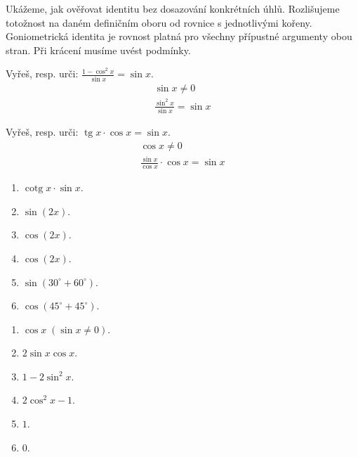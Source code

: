 \documentclass[11pt,a4paper]{article}
\begin{document}
Ukážeme, jak ověřovat identitu bez dosazování konkrétních úhlů. Rozlišujeme totožnost na daném definičním oboru od rovnice s jednotlivými kořeny.
Goniometrická identita je rovnost platná pro všechny přípustné argumenty obou stran. Při krácení musíme uvést podmínky.
\begin{prikladReseniBox}[title={Příklad 1}]
Vyřeš, resp. urči: $\frac{1-\cos^2x}{\sin x}=\sin x$.
\tcblower
\[\begin{aligned}\sin x\ne0 \\ \frac{\sin^2x}{\sin x}=\sin x\end{aligned}\]
\end{prikladReseniBox}
\begin{prikladReseniBox}[title={Příklad 2}]
Vyřeš, resp. urči: $\operatorname{tg}x\cdot\cos x=\sin x$.
\tcblower
\[\begin{aligned}\cos x\ne0 \\ \frac{\sin x}{\cos x}\cdot\cos x=\sin x\end{aligned}\]
\end{prikladReseniBox}
\begin{zadaniReseniBox}[title={Samostatná práce 1}]
\begin{enumerate}[label=\alph*)]
\item $\operatorname{cotg}x\cdot\sin x$.
\item $\sin(2x)$.
\item $\cos(2x)$.
\item $\cos(2x)$.
\item $\sin(30^\circ+60^\circ)$.
\item $\cos(45^\circ+45^\circ)$.
\end{enumerate}
\tcblower
\begin{enumerate}[label=\alph*)]
\item $\cos x\;(\sin x\ne0)$.
\item $2\sin x\cos x$.
\item $1-2\sin^2x$.
\item $2\cos^2x-1$.
\item $1$.
\item $0$.
\end{enumerate}
\end{zadaniReseniBox}
\end{document}
